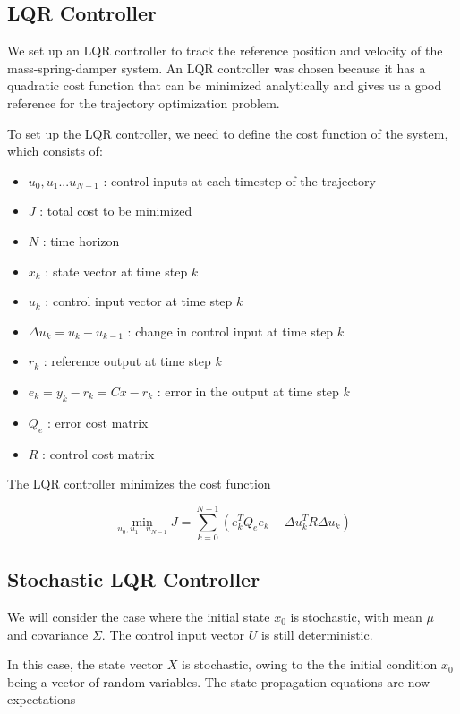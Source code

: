 \documentclass{article}
\begin{document}
\subsection{LQR Controller} \label{lqr_ctrl}
We set up an LQR controller to track the reference position and velocity of the mass-spring-damper system.
An LQR controller was chosen because it has a quadratic cost function that can be minimized analytically and gives us a
good reference for the trajectory optimization problem.

To set up the LQR controller, we need to define the cost function of the system, which consists of:

\begin{itemize}
  \item $u_0, u_1 ... u_{N-1}$ : control inputs at each timestep of the trajectory
  \item $J$ : total cost to be minimized
  \item $N$ : time horizon
  \item $x_k$ : state vector at time step $k$
  \item $u_k$ : control input vector at time step $k$
  \item $\Delta u_k = u_k - u_{k-1}$ : change in control input at time step $k$
  \item $r_k$ : reference output at time step $k$
  \item $e_k = y_k - r_k = Cx - r_k$ : error in the output at time step $k$
  \item $Q_e$ : error cost matrix
  \item $R$ : control cost matrix
\end{itemize}
The LQR controller minimizes the cost function

\begin{equation}
  \min_{u_0, u_1 ... u_{N-1}}J = \sum_{k=0}^{N-1} (e_k^T Q_e e_k + \Delta u_k^T R \Delta u_k)
\end{equation}

\subsection{Stochastic LQR Controller}
We will consider the case where the initial state $x_0$ is stochastic, with mean $\mu$ and covariance $\Sigma$.
The control input vector $U$ is still deterministic.

In this case, the state vector $X$ is stochastic, owing to the the initial condition $x_0$ being a vector of random variables. The state propagation equations are now expectations
\end{document}
